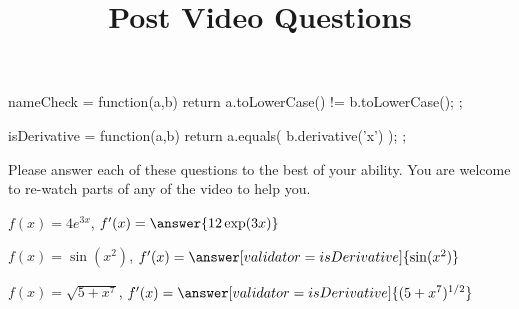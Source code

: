 \documentclass[handout]{ximera}
\title{Post Video Questions}
\begin{document}
\begin{abstract}
\end{abstract}


\maketitle

\begin{javascript}
nameCheck = function(a,b) {
    return a.toLowerCase() != b.toLowerCase();
  };

isDerivative = function(a,b) {
    return a.equals( b.derivative('x') );
  };

\end{javascript}

Please answer each of these questions to the best of your ability. You are welcome to re-watch parts of any of the video to help you.

\begin{problem}
$f(x)=4e^{3x}$, $f'(x)=\answer{12 \exp(3x)}$
\end{problem}

\begin{problem}
$f(x)=\sin(x^2)$, $f'(x)=\answer[validator=isDerivative]{\sin(x^2)}$
\end{problem}

\begin{problem}
$f(x)=\sqrt{5+x^7}$, $f'(x)=\answer[validator=isDerivative]{(5+x^7)^{1/2}}$
\end{problem}
\end{document}
